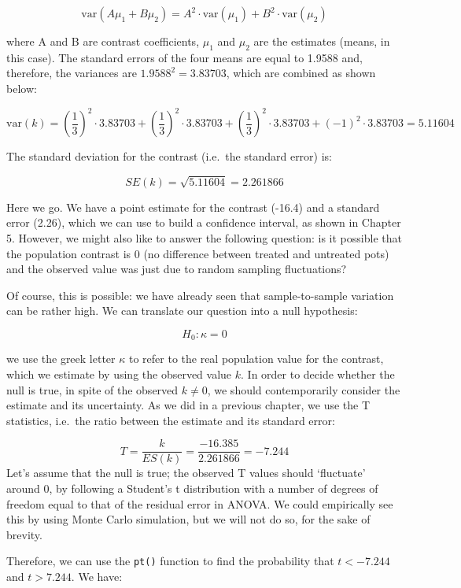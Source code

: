 \documentclass[a4paper,12pt,oneside]{book}
\begin{document}
\[\textrm{var}(A \mu_1 + B \mu_2) = A ^2 \cdot \textrm{var}(\mu_1)  + B ^2 \cdot \textrm{var}(\mu_2)\]

where A and B are contrast coefficients, \(\mu_1\) and \(\mu_2\) are the estimates (means, in this case). The standard errors of the four means are equal to 1.9588 and, therefore, the variances are \(1.9588^2 = 3.83703\), which are combined as shown below:

\[\textrm{var}(k) = \left( \frac{1}{3} \right)^2 \cdot 3.83703  +  \left( \frac{1}{3}\right)^2 \cdot 3.83703 + \left( \frac{1}{3}  \right)^2 \cdot 3.83703 + \left( - 1 \right)^2 \cdot 3.83703  = 5.11604\]

The standard deviation for the contrast (i.e.~the standard error) is:

\[SE(k) = \sqrt{5.11604} = 2.261866\]

Here we go. We have a point estimate for the contrast (-16.4) and a standard error (2.26), which we can use to build a confidence interval, as shown in Chapter 5. However, we might also like to answer the following question: is it possible that the population contrast is 0 (no difference between treated and untreated pots) and the observed value was just due to random sampling fluctuations?

Of course, this is possible: we have already seen that sample-to-sample variation can be rather high. We can translate our question into a null hypothesis:

\[H_0: \kappa = 0\]

we use the greek letter \(\kappa\) to refer to the real population value for the contrast, which we estimate by using the observed value \(k\). In order to decide whether the null is true, in spite of the observed \(k \neq 0\), we should contemporarily consider the estimate and its uncertainty. As we did in a previous chapter, we use the T statistics, i.e.~the ratio between the estimate and its standard error:

\[T = \frac{k}{ES(k)} = \frac{-16.385}{2.261866} = -7.244\]
Let's assume that the null is true; the observed T values should `fluctuate' around 0, by following a Student's t distribution with a number of degrees of freedom equal to that of the residual error in ANOVA. We could empirically see this by using Monte Carlo simulation, but we will not do so, for the sake of brevity.

Therefore, we can use the \texttt{pt()} function to find the probability that \(t < -7.244\) and \(t > 7.244\). We have:
\end{document}
